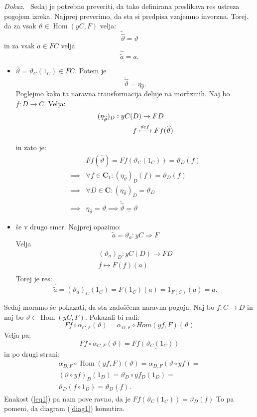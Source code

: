 \documentclass[12pt,a4paper]{book}
\theoremstyle{definition}
\theoremstyle{plain}
\newenvironment{dokaz}{\emph{Dokaz.}\ }{\hspace{\fill}{$\Box$}}
\theoremstyle{definition}
\theoremstyle{remark}
\DeclareMathOperator{\Hom}{Hom}
\begin{document}
\begin{dokaz}
Sedaj je potrebno preveriti, da tako definirana preslikava res ustreza pogojem izreka.
Najprej preverimo, da sta si predpisa vzajemno inverzna.
Torej, da za vsak $\vartheta \in \Hom(yC,F)$ velja: 
$$\widetilde{\widehat{\vartheta}} = \vartheta$$
in za vsak $a \in FC$ velja
$$\widehat{\widetilde{a}} = a.$$
\begin{itemize}
\item
$\widehat{\vartheta} = \vartheta_C(1_C) \in FC$.
Potem je 
$$\widetilde{\widehat{\vartheta}} = \eta_{\widehat{\vartheta}}.$$
Poglejmo kako ta naravna transformacija deluje na morfizmih. Naj bo $f : D \to C$. Velja:
\begin{align*}
(\eta_{\widehat{\vartheta}})_D : yC(&D) \to FD \\
&f \xmapsto{def} Ff(\widehat{\vartheta}) \\
\end{align*}

in zato je:
\begin{align*}
&Ff(\widehat{\vartheta}) = Ff(\vartheta_C(1_C)) = \vartheta_D(f) \\
\implies& \forall f \in \textbf{C}_1  : (\eta_{\widehat{\vartheta}})_D(f) = \vartheta_D(f) \\
\implies& \forall D \in \textbf{C} : (\eta_{\widehat{\vartheta}})_D = \vartheta_D \\
\implies& \eta_{\widehat{\vartheta}} = \vartheta
\implies \underline{\widetilde{\widehat{\vartheta}} = \vartheta}
\end{align*}
\item še v drugo smer. Najprej opazimo:
$$\widetilde{a} = \vartheta_a : yC \Rightarrow F$$
Velja
\begin{align*}
(\vartheta_a)_D : yC(D) \to FD \\
f \mapsto F(f)(a) \\
\end{align*}
Torej je res:
$$\widehat{\widetilde{a}} = (\vartheta_a)_C(1_C) = F(1_C)(a) = 1_{F(C)}(a) = a.$$
\end{itemize}

Sedaj moramo še pokazati, da sta zadoščena naravna pogoja.
Naj bo $f : C \to D$ in naj bo $\vartheta \in \Hom(yC,F)$.
Pokazali bi radi:
\begin{equation}
Ff \circ \alpha_{C,F}(\vartheta) = \alpha_{D,F} \circ Hom(yf,F)(\vartheta)
\end{equation}
Velja pa:
$$Ff \circ \alpha_{C,F}(\vartheta) = \underline{Ff(\vartheta_C(1_C))}$$
in po drugi strani:
\begin{align*}
\alpha_{D,F} \circ \Hom(yf,F)(\vartheta) = \alpha_{D,F}(\vartheta \circ yf) = \\
(\vartheta \circ yf)_D (1_D) = \vartheta_D \circ yf_D(1_D) = \\
\vartheta_D(f \circ 1_D) = \underline{\vartheta_D(f)}.
\end{align*}
Enakost (\ref{eq1}) pa nam pove ravno, da je $Ff(\vartheta_C(1_C)) = \vartheta_D(f)$
To pa pomeni, da diagram (\ref{diag1}) komutira.


\end{dokaz}
\end{document}
